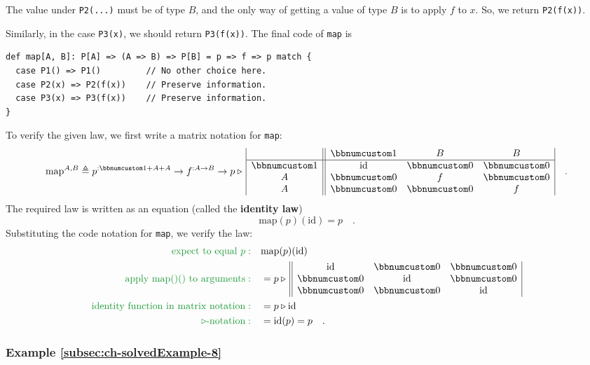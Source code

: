 The value under \lstinline!P2(...)! must be of type $B$, and the
only way of getting a value of type $B$ is to apply $f$ to $x$.
So, we return \lstinline!P2(f(x))!.

Similarly, in the case \lstinline!P3(x)!, we should return \lstinline!P3(f(x))!.
The final code of \lstinline!map! is
\begin{lstlisting}
def map[A, B]: P[A] => (A => B) => P[B] = p => f => p match {
  case P1() => P1()         // No other choice here.
  case P2(x) => P2(f(x))    // Preserve information.
  case P3(x) => P3(f(x))    // Preserve information.
}
\end{lstlisting}

To verify the given law, we first write a matrix notation for \lstinline!map!:
\[
\text{map}^{A,B}\triangleq p^{:\bbnum 1+A+A}\rightarrow f^{:A\rightarrow B}\rightarrow p\triangleright\,\begin{array}{|c||ccc|}
 & \bbnum 1 & B & B\\
\hline \bbnum 1 & \text{id} & \bbnum 0 & \bbnum 0\\
A & \bbnum 0 & f & \bbnum 0\\
A & \bbnum 0 & \bbnum 0 & f
\end{array}\quad.
\]
The required law is written as an equation (called the
\textbf{identity law})
\[
\text{map}(p)(\text{id})=p\quad.
\]
Substituting the code notation for \lstinline!map!, we verify the
law:
\begin{align*}
{\color{greenunder}\text{expect to equal }p:}\quad & \text{map}(p)(\text{id})\\
{\color{greenunder}\text{apply map()() to arguments}:}\quad & =p\triangleright\,\begin{array}{||ccc|}
\text{id} & \bbnum 0 & \bbnum 0\\
\bbnum 0 & \text{id} & \bbnum 0\\
\bbnum 0 & \bbnum 0 & \text{id}
\end{array}\\
{\color{greenunder}\text{identity function in matrix notation}:}\quad & =p\triangleright\text{id}\\
{\color{greenunder}\triangleright\text{-notation}:}\quad & =\text{id}(p)=p\quad.
\end{align*}


\subsubsection{Example \label{subsec:ch-solvedExample-8}\ref{subsec:ch-solvedExample-8}}

